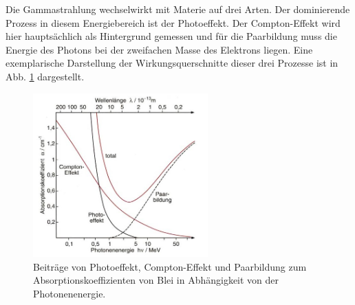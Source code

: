 Die Gammastrahlung wechselwirkt mit Materie auf drei Arten. Der dominierende Prozess in diesem Energiebereich ist der Photoeffekt. Der Compton-Effekt wird hier hauptsächlich als Hintergrund gemessen und für die Paarbildung muss die Energie des Photons bei der zweifachen Masse des Elektrons liegen.  
Eine exemplarische Darstellung der Wirkungsquerschnitte dieser drei Prozesse ist in Abb. \ref{abb:wirkungsquerschnitt} dargestellt.

\begin{figure}
    \centering
    \includegraphics[width=0.6\textwidth]{figures/strahlung.jpg}
    \caption{Beiträge von Photoeffekt, Compton-Effekt und Paarbildung zum Absorptionskoeffizienten von Blei in Abhängigkeit von der Photonenenergie. \cite{strahlung}}
    \label{abb:wirkungsquerschnitt}
    \end{figure}